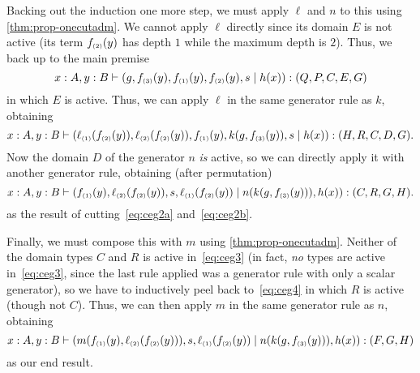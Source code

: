 \begin{props}
Backing out the induction one more step, we must apply $\ell$ and $n$ to this using \cref{thm:prop-onecutadm}.
We cannot apply $\ell$ directly since its domain $E$ is not active (its term $f_{\scriptscriptstyle(2)}(y)$ has depth $1$ while the maximum depth is $2$).
Thus, we back up to the main premise
\[ x:A,y:B \vdash (g,f_{\scriptscriptstyle(3)}(y),f_{\scriptscriptstyle(1)}(y),f_{\scriptscriptstyle(2)}(y),s \mid h(x)) : (Q,P,C,E,G) \]
in which $E$ is active.
Thus, we can apply $\ell$ in the same generator rule as $k$, obtaining
\begin{equation}
  x:A,y:B \types (\ell\s1(f\s2(y)),\ell\s2(f\s2(y)),f\s1(y),k(g,f\s3(y)),s \mid h(x)) : (H,R,C,D,G).\label{eq:ceg4}
\end{equation}
Now the domain $D$ of the generator $n$ \emph{is} active, so we can directly apply it with another generator rule, obtaining (after permutation)
\begin{equation}
  x:A,y:B \types (f\s1(y),\ell\s2(f\s2(y)),s,\ell\s1(f\s2(y)) \mid n(k(g,f\s3(y))),h(x)) : (C,R,G,H).\label{eq:ceg3}
\end{equation}
as the result of cutting~\eqref{eq:ceg2a} and~\eqref{eq:ceg2b}.

Finally, we must compose this with $m$ using \cref{thm:prop-onecutadm}.
Neither of the domain types $C$ and $R$ is active in~\eqref{eq:ceg3} (in fact, \emph{no} types are active in~\eqref{eq:ceg3}, since the last rule applied was a generator rule with only a scalar generator), so we have to inductively peel back to~\eqref{eq:ceg4} in which $R$ is active (though not $C$).
Thus, we can then apply $m$ in the same generator rule as $n$, obtaining
\begin{equation}
  x:A,y:B \types (m(f\s1(y),\ell\s2(f\s2(y))),s,\ell\s1(f\s2(y)) \mid n(k(g,f\s3(y))),h(x)) : (F,G,H)\label{eq:ceg}
\end{equation}
as our end result.


\end{props}
